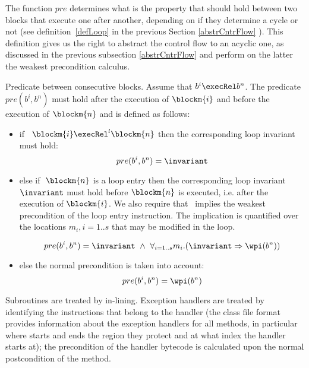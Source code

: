 The function  $pre$ determines what is the property that should hold between two blocks that execute one after another,
depending on if they determine a cycle or not (see definition~\ref{defLoop} in the previous Section \ref{abstrCntrFlow} ).  This definition
gives us the right to abstract the control flow to an acyclic one, as discussed in the previous subsection \ref{abstrCntrFlow} and perform on the latter the weakest precondition calculus.  
\begin{definition}
{Predicate between consecutive blocks.}\label{post2}
Assume that $b^i \execRel b^n$. The predicate $pre(b^{i}, b^{n})$ must hold after the execution of $\blockm{i}$ and before the execution of $\blockm{n}$ and is defined as follows:
\begin{itemize}
\item if \ $\blockm{i} \execRel^l \blockm{n}$ 
then the corresponding loop invariant must hold:
$$
pre(b^{i}, b^{n}) =  \invariant
$$

\item else if $\ \blockm{n}$ is a loop entry then the corresponding loop invariant $\invariant$ must hold before $\blockm{n}$ is executed, i.e. after the execution of $\blockm{i}$. We also require that \invariant \ implies the weakest precondition of the loop entry instruction. The implication is quantified over the locations $m_i , i= 1..s$ that may be modified in the loop.

$$
pre(b^{i}, b^{n}) = \invariant \ \wedge \ \forall_{i = 1..s} m_i.(
\invariant \Rightarrow \wpi(b^{n}))
$$
\item else the normal precondition is taken into account:
$$
pre(b^{i}, b^{n}) = \wpi(b^{n})
$$
\end{itemize}
\end{definition}

Subroutines are treated by in-lining. Exception handlers are 
treated by identifying the instructions that belong to the handler (the class file format provides information about the exception handlers for all methods, in particular where starts and ends the region 
they protect and at what index the handler starts at); the precondition of the handler bytecode is calculated upon the normal postcondition of the method.

